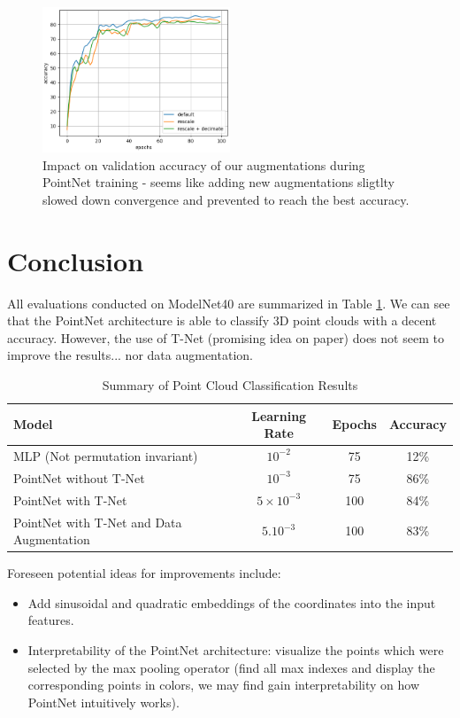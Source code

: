 \documentclass[a4paper]{article}
\begin{document}
\begin{figure}[H]
    \centering
    \includegraphics[width=0.5\textwidth]{figures/Q4.png}
    \caption{Impact on validation accuracy of our augmentations during PointNet training - seems like adding new augmentations sligtlty slowed down convergence and prevented to reach the best accuracy.}
    \label{fig:pointNet augmentations}
\end{figure}

\section*{Conclusion}
All evaluations conducted on ModelNet40 are summarized in Table \ref{tab:classification_results}. We can see that the PointNet architecture is able to classify 3D point clouds with a decent accuracy. However, the use of T-Net (promising idea on paper) does not seem to improve the results... nor data augmentation.
\begin{table}[H]
    \centering
    \begin{tabular}{|l|c|c|c|}
    \hline
    \textbf{Model} & \textbf{Learning Rate} & \textbf{Epochs} & \textbf{Accuracy} \\ \hline
    MLP (Not permutation invariant) & $10^{-2}$ & 75 & 12\% \\ \hline
    PointNet without T-Net & $10^{-3}$ & 75 & 86\% \\ \hline
    PointNet with T-Net & $5 \times 10^{-3}$ & 100 & 84\% \\ \hline
    PointNet with T-Net and Data Augmentation & $5. 10^{-3}$ & 100 & 83\% \\ \hline
    \end{tabular}
    \caption{Summary of Point Cloud Classification Results}
    \label{tab:classification_results}
\end{table}

Foreseen potential ideas for improvements include:
\begin{itemize}
    \item Add sinusoidal and quadratic embeddings of the coordinates into the input features.
    \item Interpretability of the PointNet architecture: visualize the points which were selected by the max pooling operator (find all max indexes and display the corresponding points in colors, we may find gain interpretability on how PointNet intuitively works).
\end{itemize}
\end{document}
